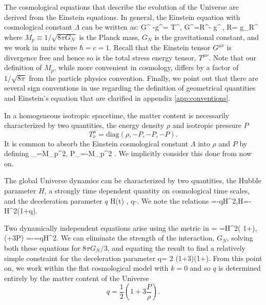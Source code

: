 The cosmological equations that describe the evolution of the Universe are derived from the Einstein equations. In general, the Einstein equation with cosmological constant $\Lambda$ can be written as:
\beqn\label{Einstine}
G^{\mu\nu} -\Lambda g^{\mu\nu}= T^{\mu\nu}, \quad G^{\mu\nu}=R^{\mu\nu}- g^{\mu\nu}\,,
\quad R= g_{\mu\nu}R^{\mu\nu}
\eeqn
where $M_p\equiv 1/\sqrt{8\pi G_N}$ is the Planck mass, $G_N$ is the gravitational constant, and we work in units where $\hbar=c=1$. Recall that the Einstein tensor $G^{\mu\nu}$ is divergence free and hence so is the total stress energy tensor, $T^{\mu\nu}$. Note that our definition of $M_p$, while more convenient in cosmology, differs by a factor of $1/\sqrt{8\pi}$ from the particle physics convention. Finally, we point out that there are several sign conventions in use regarding the definition of geometrical quantities and Einstein's equation that are clarified in appendix \ref{app:conventions}.

 In a homogeneous isotropic spacetime, the matter content is necessarily characterized by two quantities, the energy density $\rho$ and isotropic pressure $P$
\begin{equation}
 T^\mu_\nu =\mathrm{diag}(\rho, -P, -P, -P).
\end{equation}
 It is common to absorb the Einstein cosmological constant $\Lambda$ into $\rho$ and $P$ by defining
\beqn\label{EpsLam}
\rho_\Lambda=M_p^2\Lambda, \qquad P_\Lambda=-M_p^2 \Lambda.
\eeqn
We implicitly consider this done from now on. 


The global Universe dynamics can be characterized by two quantities, the Hubble parameter $H$, a strongly time dependent quantity on cosmological time scales, and the deceleration parameter $q$
\beqn\label{dynamic}
\equiv H(t) ,\quad 
q\equiv -.
\eeqn
We note the relations
\beqn
\quad {}=-qH^2,\quad \dot H=-H^2(1+q). 
\eeqn

Two dynamically independent equations arise using the metric  in 
\beqn\label{hubble}
 \rho = 
=H^2\left( 1+\right),
\qquad
{} (\rho+3P) =-=qH^2.
\eeqn
We can eliminate the strength of the interaction, $G_N$, solving both these equations for ${8\pi G_N}/{3}$, and equating the result to find a relatively simple constraint for the deceleration parameter
\beqn\label{qparam}
q= 2 \left(1+3\right)\left(1+\right).
\eeqn
 From this point on, we work within the flat cosmological model with $k=0$ and so $q$ is determined entirely by the matter content of the Universe
\begin{equation}\label{qparam}
q=\frac 1 2 \left(1+3\frac{P}{\rho}\right).
\end{equation}


